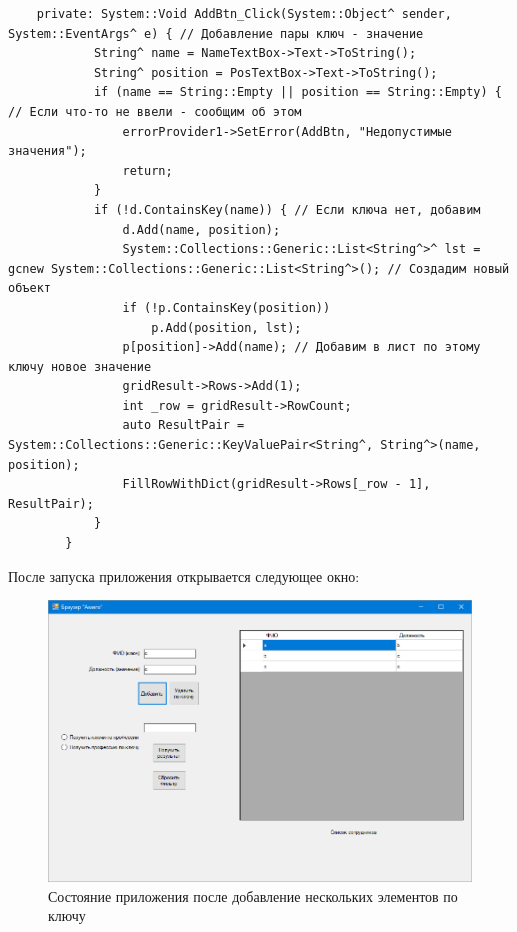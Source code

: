 \begin{verbatim}
    private: System::Void AddBtn_Click(System::Object^ sender, System::EventArgs^ e) { // Добавление пары ключ - значение
			String^ name = NameTextBox->Text->ToString();
			String^ position = PosTextBox->Text->ToString();
			if (name == String::Empty || position == String::Empty) { // Если что-то не ввели - сообщим об этом
				errorProvider1->SetError(AddBtn, "Недопустимые значения");
				return;
			}
			if (!d.ContainsKey(name)) { // Если ключа нет, добавим
				d.Add(name, position);
				System::Collections::Generic::List<String^>^ lst = gcnew System::Collections::Generic::List<String^>(); // Создадим новый объект
				if (!p.ContainsKey(position)) 
					p.Add(position, lst);
				p[position]->Add(name); // Добавим в лист по этому ключу новое значение
				gridResult->Rows->Add(1);
				int _row = gridResult->RowCount;
				auto ResultPair = System::Collections::Generic::KeyValuePair<String^, String^>(name, position);
				FillRowWithDict(gridResult->Rows[_row - 1], ResultPair);
			}	
		}
\end{verbatim}

После запуска приложения открывается следующее окно:
\begin{figure}[H]
    \centering
    \includegraphics[scale=0.4]{task7/result3.png}
    \caption{Состояние приложения после добавление нескольких элементов по ключу}
\end{figure}

